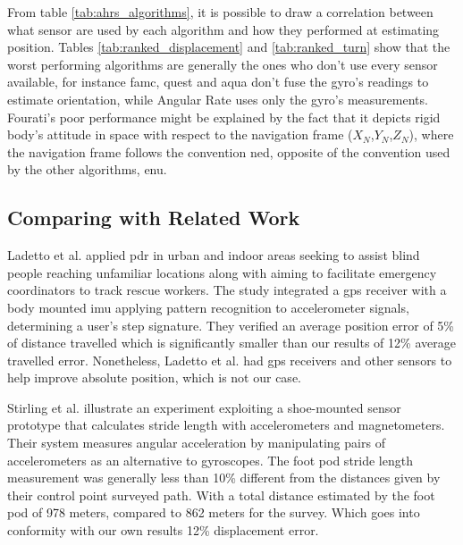 From table \ref{tab:ahrs_algorithms}, it is possible to draw a correlation between what sensor are used by each algorithm and how they performed at estimating position. Tables \ref{tab:ranked_displacement} and \ref{tab:ranked_turn} show that the worst performing algorithms are generally the ones who don't use every sensor available, for instance \acrshort{famc}, \acrshort{quest} and \acrshort{aqua} don't fuse the gyro's readings to estimate orientation, while Angular Rate uses only the gyro's measurements. Fourati's poor performance might be explained by the fact that it depicts rigid body's attitude in space with respect to the navigation frame ($X_N$,$Y_N$,$Z_N$), where the navigation frame follows the convention \acrfull{ned}, opposite of the convention used by the other algorithms, \acrfull{enu}.




\subsection{Comparing with Related Work}

Ladetto et al. \cite{ladetto2002step} applied \acrshort{pdr} in urban and indoor areas seeking to assist blind people reaching unfamiliar locations along with aiming to facilitate emergency coordinators to track rescue workers. The study integrated a \acrshort{gps} receiver with a body mounted \acrshort{imu} applying pattern recognition to accelerometer signals, determining a user's step signature. They verified an average position error of 5\% of distance travelled which is significantly smaller than our results of 12\% average travelled error. Nonetheless, Ladetto et al. \cite{ladetto2002step} had \acrshort{gps} receivers and other sensors to help improve absolute position, which is not our case.

Stirling et al. \cite{stirling2003innovative} illustrate an experiment exploiting a shoe-mounted sensor prototype that calculates stride length with accelerometers and magnetometers. Their system measures angular acceleration by manipulating pairs of accelerometers as an alternative to gyroscopes. The foot pod stride length measurement was
generally less than 10\% different from the distances given by their control point
surveyed path. With a total distance estimated by the foot pod of 978 meters, compared to 862 meters for the survey. Which goes into conformity with our own results 12\% displacement error.

